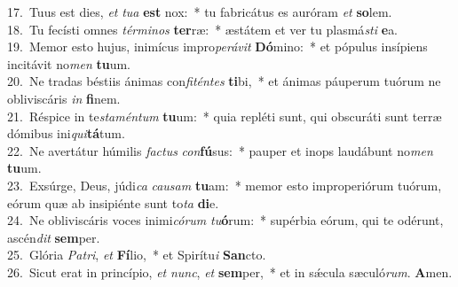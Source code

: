 {17.~}Tuus est dies, \textit{et} \textit{tu}\textit{a} \textbf{est} nox:~* tu fabricátus es auróram \textit{et} \textbf{so}lem.\\
{18.~}Tu fecísti omnes \textit{tér}\textit{mi}\textit{nos} \textbf{ter}ræ:~* æstátem et ver tu plasmá\textit{sti} \textbf{e}a.\\
{19.~}Memor esto hujus, inimícus impro\textit{pe}\textit{rá}\textit{vit} \textbf{Dó}mino:~* et pópulus insípiens incitávit no\textit{men} \textbf{tu}um.\\
{20.~}Ne tradas béstiis ánimas con\textit{fi}\textit{tén}\textit{tes} \textbf{ti}bi,~* et ánimas páuperum tuórum ne obliviscáris \textit{in} \textbf{fi}nem.\\
{21.~}Réspice in te\textit{sta}\textit{mén}\textit{tum} \textbf{tu}um:~* quia repléti sunt, qui obscuráti sunt terræ dómibus ini\textit{qui}\textbf{tá}tum.\\
{22.~}Ne avertátur húmilis \textit{fa}\textit{ctus} \textit{con}\textbf{fú}sus:~* pauper et inops laudábunt no\textit{men} \textbf{tu}um.\\
{23.~}Exsúrge, Deus, júdi\textit{ca} \textit{cau}\textit{sam} \textbf{tu}am:~* memor esto improperiórum tuórum, eórum quæ ab insipiénte sunt to\textit{ta} \textbf{di}e.\\
{24.~}Ne obliviscáris voces inimi\textit{có}\textit{rum} \textit{tu}\textbf{ó}rum:~* supérbia eórum, qui te odérunt, ascén\textit{dit} \textbf{sem}per.\\
{25.~}Glória \textit{Pa}\textit{tri}, \textit{et} \textbf{Fí}lio,~* et Spirítu\textit{i} \textbf{San}cto.\\
{26.~}Sicut erat in princípio, \textit{et} \textit{nunc}, \textit{et} \textbf{sem}per,~* et in sǽcula sæculó\textit{rum}. \textbf{A}men.\\
